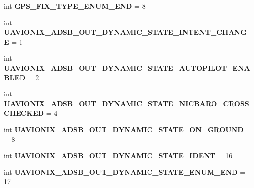 \begin{DoxyCompactItemize}
\mbox{\label{namespacepymavlink_1_1dialects_1_1v10_ae96969f2653814b86c88f08ced86f5d1}} 
int {\bfseries G\+P\+S\+\_\+\+F\+I\+X\+\_\+\+T\+Y\+P\+E\+\_\+\+E\+N\+U\+M\+\_\+\+E\+ND} = 8
\item 
\mbox{\label{namespacepymavlink_1_1dialects_1_1v10_a37220b916a96e2b5c95f4fffd15f18d7}} 
int {\bfseries U\+A\+V\+I\+O\+N\+I\+X\+\_\+\+A\+D\+S\+B\+\_\+\+O\+U\+T\+\_\+\+D\+Y\+N\+A\+M\+I\+C\+\_\+\+S\+T\+A\+T\+E\+\_\+\+I\+N\+T\+E\+N\+T\+\_\+\+C\+H\+A\+N\+GE} = 1
\item 
\mbox{\label{namespacepymavlink_1_1dialects_1_1v10_a6a1f6f10a2ee008b2f53b8f37b77de84}} 
int {\bfseries U\+A\+V\+I\+O\+N\+I\+X\+\_\+\+A\+D\+S\+B\+\_\+\+O\+U\+T\+\_\+\+D\+Y\+N\+A\+M\+I\+C\+\_\+\+S\+T\+A\+T\+E\+\_\+\+A\+U\+T\+O\+P\+I\+L\+O\+T\+\_\+\+E\+N\+A\+B\+L\+ED} = 2
\item 
\mbox{\label{namespacepymavlink_1_1dialects_1_1v10_a20fa916f2c10b45dbc5c3f09756bfba2}} 
int {\bfseries U\+A\+V\+I\+O\+N\+I\+X\+\_\+\+A\+D\+S\+B\+\_\+\+O\+U\+T\+\_\+\+D\+Y\+N\+A\+M\+I\+C\+\_\+\+S\+T\+A\+T\+E\+\_\+\+N\+I\+C\+B\+A\+R\+O\+\_\+\+C\+R\+O\+S\+S\+C\+H\+E\+C\+K\+ED} = 4
\item 
\mbox{\label{namespacepymavlink_1_1dialects_1_1v10_a0db508326a16ad99178da67e03baab0e}} 
int {\bfseries U\+A\+V\+I\+O\+N\+I\+X\+\_\+\+A\+D\+S\+B\+\_\+\+O\+U\+T\+\_\+\+D\+Y\+N\+A\+M\+I\+C\+\_\+\+S\+T\+A\+T\+E\+\_\+\+O\+N\+\_\+\+G\+R\+O\+U\+ND} = 8
\item 
\mbox{\label{namespacepymavlink_1_1dialects_1_1v10_acdcd8d1e74ebb03d941b9e42fa1c6bf4}} 
int {\bfseries U\+A\+V\+I\+O\+N\+I\+X\+\_\+\+A\+D\+S\+B\+\_\+\+O\+U\+T\+\_\+\+D\+Y\+N\+A\+M\+I\+C\+\_\+\+S\+T\+A\+T\+E\+\_\+\+I\+D\+E\+NT} = 16
\item 
\mbox{\label{namespacepymavlink_1_1dialects_1_1v10_af1289c3ddb18689c3e769faff9ddc66c}} 
int {\bfseries U\+A\+V\+I\+O\+N\+I\+X\+\_\+\+A\+D\+S\+B\+\_\+\+O\+U\+T\+\_\+\+D\+Y\+N\+A\+M\+I\+C\+\_\+\+S\+T\+A\+T\+E\+\_\+\+E\+N\+U\+M\+\_\+\+E\+ND} = 17
\item 

\end{DoxyCompactItemize}
